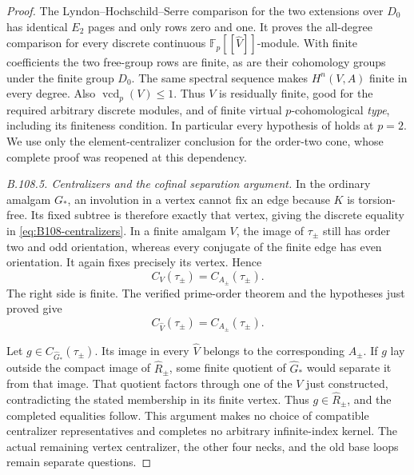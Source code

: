\begin{proof}
The Lyndon--Hochschild--Serre comparison for the two extensions
over $D_0$ has identical $E_2$ pages and only rows zero and
one. It proves the all-degree comparison for every discrete
continuous $\mathbb F_p[[\widehat V]]$-module. With finite
coefficients the two free-group rows are finite, as are their
cohomology groups under the finite group $D_0$. The same
spectral sequence makes $H^n(V,A)$ finite in every degree.
Also $\operatorname{vcd}_p(V)\leq1$. Thus $V$ is residually
finite, good for the required arbitrary discrete modules, and
of finite virtual $p$-cohomological \emph{type}, including its
finiteness condition. In particular every hypothesis of
\citet[Theorem~4.3, prime-order case in Sections~4.1--4.2]{BoggiZalesskii2025}
holds at $p=2$. We use only the element-centralizer conclusion
for the order-two cone, whose complete proof was reopened at
this dependency.

\emph{B.108.5. Centralizers and the cofinal separation argument.}
In the ordinary amalgam $G_*$, an involution in a vertex cannot
fix an edge because $K$ is torsion-free. Its fixed subtree is
therefore exactly that vertex, giving the discrete equality
in \eqref{eq:B108-centralizers}. In a finite amalgam $V$, the
image of $\tau_\pm$ still has order two and odd orientation,
whereas every conjugate of the finite edge has even orientation.
It again fixes precisely its vertex. Hence
\[
 C_V(\tau_\pm)=C_{A_\pm}(\tau_\pm).
\]
The right side is finite. The verified prime-order theorem and
the hypotheses just proved give
\[
 C_{\widehat V}(\tau_\pm)=C_{A_\pm}(\tau_\pm).
\]

Let $g\in C_{\widehat G_*}(\tau_\pm)$. Its image in every
$\widehat V$ belongs to the corresponding $A_\pm$. If $g$
lay outside the compact image of $\widehat R_\pm$, some finite
quotient of $\widehat G_*$ would separate it from that image.
That quotient factors through one of the $V$ just constructed,
contradicting the stated membership in its finite vertex. Thus
$g\in\widehat R_\pm$, and the completed equalities follow.
This argument makes no choice of compatible centralizer
representatives and completes no arbitrary infinite-index
kernel. The actual remaining vertex centralizer, the other
four necks, and the old base loops remain separate questions.
\end{proof}
